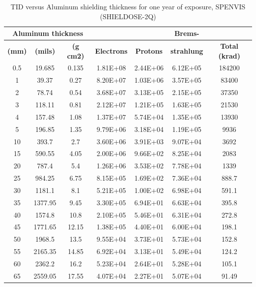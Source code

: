 \begin{table}[htbp]
  \centering
  
    \begin{tabular}{|c|c|c|c|c|c|c|}
    \hline
    \multicolumn{3}{|c|}{\textbf{Aluminum thickness}} &       &       & \textbf{Brems- } &  \bigstrut\\
    \hline
    \textbf{(mm)} & \textbf{(mils)} & \textbf{(g cm2)} & \textbf{Electrons} & \textbf{Protons} & \textbf{strahlung} & \textbf{Total (krad)} \bigstrut\\
    \hline
    0.5   & 19.685 & 0.135 & 1.81E+08 & 2.44E+06 & 6.12E+05 & 184200 \bigstrut\\
    \hline
    1     & 39.37 & 0.27  & 8.20E+07 & 1.03E+06 & 3.57E+05 & 83400 \bigstrut\\
    \hline
    2     & 78.74 & 0.54  & 3.68E+07 & 3.13E+05 & 2.15E+05 & 37350 \bigstrut\\
    \hline
    3     & 118.11 & 0.81  & 2.12E+07 & 1.21E+05 & 1.63E+05 & 21530 \bigstrut\\
    \hline
    4     & 157.48 & 1.08  & 1.37E+07 & 5.74E+04 & 1.35E+05 & 13930 \bigstrut\\
    \hline
    5     & 196.85 & 1.35  & 9.79E+06 & 3.18E+04 & 1.19E+05 & 9936 \bigstrut\\
    \hline
    10    & 393.7 & 2.7   & 3.60E+06 & 3.91E+03 & 9.07E+04 & 3692 \bigstrut\\
    \hline
    15    & 590.55 & 4.05  & 2.00E+06 & 9.66E+02 & 8.25E+04 & 2083 \bigstrut\\
    \hline
    20    & 787.4 & 5.4   & 1.26E+06 & 3.53E+02 & 7.78E+04 & 1339 \bigstrut\\
    \hline
    25    & 984.25 & 6.75  & 8.15E+05 & 1.69E+02 & 7.36E+04 & 888.7 \bigstrut\\
    \hline
    30    & 1181.1 & 8.1   & 5.21E+05 & 1.00E+02 & 6.98E+04 & 591.1 \bigstrut\\
    \hline
    35    & 1377.95 & 9.45  & 3.30E+05 & 6.94E+01 & 6.63E+04 & 395.8 \bigstrut\\
    \hline
    40    & 1574.8 & 10.8  & 2.10E+05 & 5.46E+01 & 6.31E+04 & 272.8 \bigstrut\\
    \hline
    45    & 1771.65 & 12.15 & 1.38E+05 & 4.40E+01 & 6.00E+04 & 198.1 \bigstrut\\
    \hline
    50    & 1968.5 & 13.5  & 9.55E+04 & 3.73E+01 & 5.73E+04 & 152.8 \bigstrut\\
    \hline
    55    & 2165.35 & 14.85 & 6.92E+04 & 3.13E+01 & 5.49E+04 & 124.2 \bigstrut\\
    \hline
    60    & 2362.2 & 16.2  & 5.23E+04 & 2.64E+01 & 5.28E+04 & 105.1 \bigstrut\\
    \hline
    65    & 2559.05 & 17.55 & 4.07E+04 & 2.27E+01 & 5.07E+04 & 91.49 \bigstrut\\
    \hline
    \end{tabular}%
    \caption{TID versus Aluminum shielding thickness for one year of exposure, SPENVIS (SHIELDOSE-2Q)}
  \label{tab:thicknessalum}%
\end{table}%


